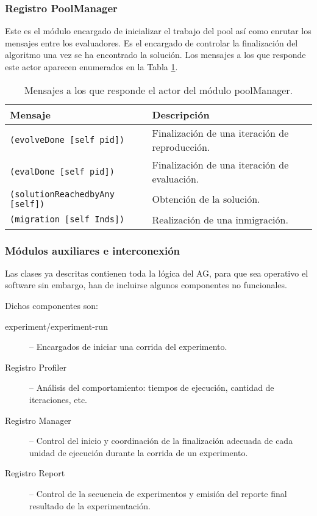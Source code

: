 \subsubsection{Registro PoolManager}

Este es el módulo encargado de inicializar el trabajo del pool así como enrutar los mensajes entre los evaluadores. Es el encargado de controlar la finalización del algoritmo una vez se ha encontrado la solución.  Los mensajes a los que responde este actor aparecen enumerados en la Tabla \ref{tb:poolManager}.

\begin{table}
  \caption{Mensajes a los que responde el actor del módulo poolManager.}\label{tb:poolManager}
  \centering
\begin{tabular}{|p{3cm}|p{7cm}|}
  \hline
   \textbf{Mensaje} &  \textbf{Descripción} \\
  \hline
  {\tt (evolveDone [self pid]) } & Finalización de una iteración de reproducción. \\
  \hline
  {\tt (evalDone [self pid])} & Finalización de una iteración de evaluación. \\
  \hline
 {\tt  (solutionReachedbyAny [self])} & Obtención de la solución. \\
  \hline
  {\tt (migration [self Inds])} & Realización de una inmigración. \\
  \hline
\end{tabular}
\end{table}


\subsubsection{Módulos auxiliares e interconexión}

Las clases ya descritas contienen toda la lógica del AG, para que sea operativo el software sin embargo, han de incluirse algunos componentes no funcionales.

\vspace{.35cm}

\noindent  Dichos componentes son:
\begin{description}

  \item[experiment/experiment-run] -- Encargados de iniciar una corrida del experimento.

  \item[Registro Profiler] -- Análisis del comportamiento: tiempos de ejecución, cantidad de iteraciones, etc.

  \item[Registro Manager] -- Control del inicio y coordinación de la finalización adecuada de cada unidad de ejecución durante la corrida de un experimento.

  \item[Registro Report] -- Control de la secuencia de experimentos y emisión del reporte final resultado de la experimentación.

\end{description}